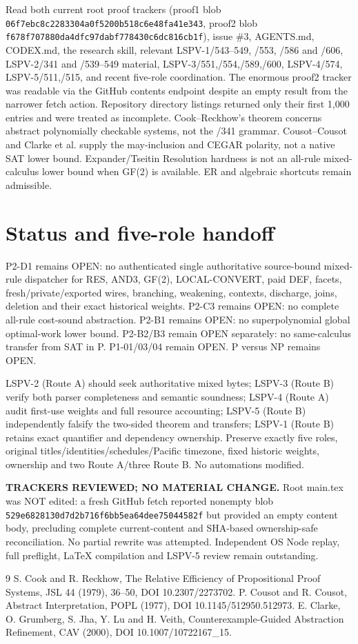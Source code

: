\documentclass[11pt]{article}
\begin{document}
Read both current root proof trackers (proof1 blob \texttt{06f7ebc8c2283304a0f5200b518c6e48fa41e343}, proof2 blob \texttt{f678f707880da4dfc97dabf778430c6dc816cb1f}), issue \#3, AGENTS.md, CODEX.md, the research skill, relevant LSPV-1/543--549, /553, /586 and /606, LSPV-2/341 and /539--549 material, LSPV-3/551,/554,/589,/600, LSPV-4/574, LSPV-5/511,/515, and recent five-role coordination. The enormous proof2 tracker was readable via the GitHub contents endpoint despite an empty result from the narrower fetch action. Repository directory listings returned only their first 1,000 entries and were treated as incomplete. Cook--Reckhow's theorem concerns abstract polynomially checkable systems, not the /341 grammar. Cousot--Cousot and Clarke et al. supply the may-inclusion and CEGAR polarity, not a native SAT lower bound. Expander/Tseitin Resolution hardness is not an all-rule mixed-calculus lower bound when GF(2) is available. ER and algebraic shortcuts remain admissible.

\section*{Status and five-role handoff}
P2-D1 remains OPEN: no authenticated single authoritative source-bound mixed-rule dispatcher for RES, AND3, GF(2), LOCAL-CONVERT, paid DEF, facets, fresh/private/exported wires, branching, weakening, contexts, discharge, joins, deletion and their exact historical weights. P2-C3 remains OPEN: no complete all-rule cost-sound abstraction. P2-B1 remains OPEN: no superpolynomial global optimal-work lower bound. P2-B2/B3 remain OPEN separately: no same-calculus transfer from SAT in P. P1-01/03/04 remain OPEN. P versus NP remains OPEN.

LSPV-2 (Route A) should seek authoritative mixed bytes; LSPV-3 (Route B) verify both parser completeness and semantic soundness; LSPV-4 (Route A) audit first-use weights and full resource accounting; LSPV-5 (Route B) independently falsify the two-sided theorem and transfers; LSPV-1 (Route B) retains exact quantifier and dependency ownership. Preserve exactly five roles, original titles/identities/schedules/Pacific timezone, fixed historic weights, ownership and two Route A/three Route B. No automations modified.

\noindent\textbf{TRACKERS REVIEWED; NO MATERIAL CHANGE.} Root main.tex was NOT edited: a fresh GitHub fetch reported nonempty blob \texttt{529e6828130d7d2b716f6bb5ea64dee75044582f} but provided an empty content body, precluding complete current-content and SHA-based ownership-safe reconciliation. No partial rewrite was attempted. Independent OS Node replay, full preflight, LaTeX compilation and LSPV-5 review remain outstanding.

\begin{thebibliography}{9}
 S. Cook and R. Reckhow, The Relative Efficiency of Propositional Proof Systems, JSL 44 (1979), 36--50, DOI 10.2307/2273702.
 P. Cousot and R. Cousot, Abstract Interpretation, POPL (1977), DOI 10.1145/512950.512973.
 E. Clarke, O. Grumberg, S. Jha, Y. Lu and H. Veith, Counterexample-Guided Abstraction Refinement, CAV (2000), DOI 10.1007/10722167_15.
\end{thebibliography}
\end{document}
